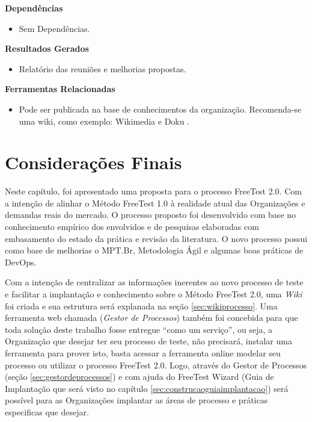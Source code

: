 \textbf{Dependências}
\begin{itemize}
    \item Sem Dependências.
\end{itemize}

\textbf{Resultados Gerados}
\begin{itemize}
    \item Relatório das reuniões e melhorias propostas.
\end{itemize}

\textbf{Ferramentas Relacionadas}
\begin{itemize}
    \item Pode ser publicada na base de conhecimentos da organização. Recomenda-se uma wiki, como exemplo: Wikimedia \cite{Wikimedia} e Doku \cite{Doku}.
\end{itemize}


\section{Considerações Finais}
\label{sec:consideracoesfinaiscap4}

Neste capítulo, foi apresentado uma proposta para o processo FreeTest 2.0. Com a intenção de alinhar o Método FreeTest 1.0 à realidade atual das Organizações e demandas reais do mercado. O processo proposto foi desenvolvido com base no conhecimento empírico dos envolvidos e de pesquisas elaboradas com embasamento do estado da prática e revisão da literatura. O novo processo possui como base de melhorias o MPT.Br, Metodologia Ágil e algumas boas práticas de DevOps. 

Com a intenção de centralizar as informações inerentes ao novo processo de teste e facilitar a implantação e conhecimento sobre o Método FreeTest 2.0, uma \textit{Wiki} foi criada e sua estrutura será explanada na seção \ref{sec:wikiprocesso}. Uma ferramenta web chamada (\textit{Gestor de Processos}) também foi concebida para que toda solução deste trabalho fosse entregue “como um serviço”, ou seja, a Organização que desejar ter seu processo de teste, não precisará, instalar uma ferramenta para prover isto, basta acessar a ferramenta online modelar seu processo ou utilizar o processo FreeTest 2.0. Logo, através do Gestor de Processos (seção \ref{sec:gestordeprocessos}) e com ajuda do FreeTest Wizard (Guia de Implantação que será visto no capítulo \ref{sec:construcaoguiaimplantacao}) será possível para as Organizações implantar as áreas de processo e práticas especificas que desejar.